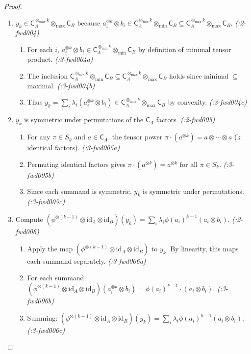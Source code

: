 \documentclass[11pt,a4paper]{article}
\theoremstyle{definition}
\theoremstyle{plain}
\newcommand{\proofstep}[2]{\item[$\langle #1 \rangle$#2.]}
\newcommand{\tmin}{{\otimes_{\min}}}
\newcommand{\tmax}{{\otimes_{\max}}}
\newcommand{\C}{\mathsf{C}}
\begin{document}
\begin{proof}
\begin{enumerate}[leftmargin=2em]
\proofstep{1}{4} $y_k \in \C_A^{\tmax k} \tmax \C_B$ because $a_i^{\otimes k} \otimes b_i \in \C_A^{\tmin k} \tmin \C_B \subseteq \C_A^{\tmax k} \tmax \C_B$. \textit{(:2-fwd004)}
\begin{enumerate}[leftmargin=1.5em, label=$\langle 2.\alph* \rangle$]
\item For each $i$, $a_i^{\otimes k} \otimes b_i \in \C_A^{\tmin k} \tmin \C_B$ by definition of minimal tensor product. \textit{(:3-fwd004a)}
\item The inclusion $\C_A^{\tmin k} \tmin \C_B \subseteq \C_A^{\tmax k} \tmax \C_B$ holds since minimal $\subseteq$ maximal. \textit{(:3-fwd004b)}
\item Thus $y_k = \sum_i \lambda_i(a_i^{\otimes k} \otimes b_i) \in \C_A^{\tmax k} \tmax \C_B$ by convexity. \textit{(:3-fwd004c)}
\end{enumerate}

\proofstep{1}{5} $y_k$ is symmetric under permutations of the $\C_A$ factors. \textit{(:2-fwd005)}
\begin{enumerate}[leftmargin=1.5em, label=$\langle 2.\alph* \rangle$]
\item For any $\pi \in S_k$ and $a \in \C_A$, the tensor power $\pi \cdot (a^{\otimes k}) = a \otimes \cdots \otimes a$ (k identical factors). \textit{(:3-fwd005a)}
\item Permuting identical factors gives $\pi \cdot (a^{\otimes k}) = a^{\otimes k}$ for all $\pi \in S_k$. \textit{(:3-fwd005b)}
\item Since each summand is symmetric, $y_k$ is symmetric under permutations. \textit{(:3-fwd005c)}
\end{enumerate}

\proofstep{1}{6} Compute $(\phi^{\otimes(k-1)} \otimes \mathrm{id}_A \otimes \mathrm{id}_B)(y_k) = \sum_i \lambda_i \phi(a_i)^{k-1} (a_i \otimes b_i)$. \textit{(:2-fwd006)}
\begin{enumerate}[leftmargin=1.5em, label=$\langle 2.\alph* \rangle$]
\item Apply the map $(\phi^{\otimes(k-1)} \otimes \mathrm{id}_A \otimes \mathrm{id}_B)$ to $y_k$. By linearity, this maps each summand separately. \textit{(:3-fwd006a)}
\item For each summand: $(\phi^{\otimes(k-1)} \otimes \mathrm{id}_A \otimes \mathrm{id}_B)(a_i^{\otimes k} \otimes b_i) = \phi(a_i)^{k-1} \cdot (a_i \otimes b_i)$. \textit{(:3-fwd006b)}
\item Summing: $(\phi^{\otimes(k-1)} \otimes \mathrm{id}_A \otimes \mathrm{id}_B)(y_k) = \sum_i \lambda_i \phi(a_i)^{k-1} (a_i \otimes b_i)$. \textit{(:3-fwd006c)}
\end{enumerate}


\end{enumerate}
\end{proof}
\end{document}
